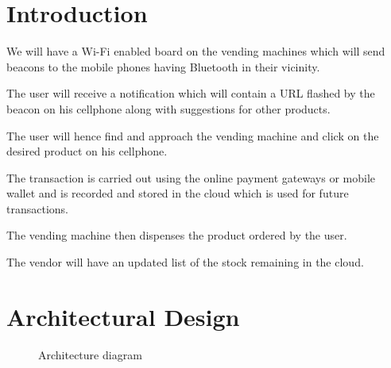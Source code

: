 \documentclass[oneside,a4paper,12pt]{report}
\begin{document}
 \section{Introduction}  
 We will have a Wi-Fi enabled board on the vending machines which will send beacons to the mobile phones having Bluetooth in their vicinity.
 
 The user will receive a notification which will contain a URL flashed by the beacon on his cellphone along with suggestions for other products.

The user will hence find and approach the vending machine and click on the desired product on his cellphone.

 The transaction is carried out using the online payment gateways or mobile wallet and is recorded and stored in the cloud which is used for future transactions.

 The vending machine then dispenses the product ordered by the user.

The vendor will have an updated list of the stock remaining in the cloud.  
\section{Architectural Design}  

 
  \begin{center}
	\begin{figure}[!htbp]
		\centering
	  \caption{Architecture diagram}
	  \label{fig:arch-dig}
	\end{figure}
\end{center} 
\newpage
\end{document}
